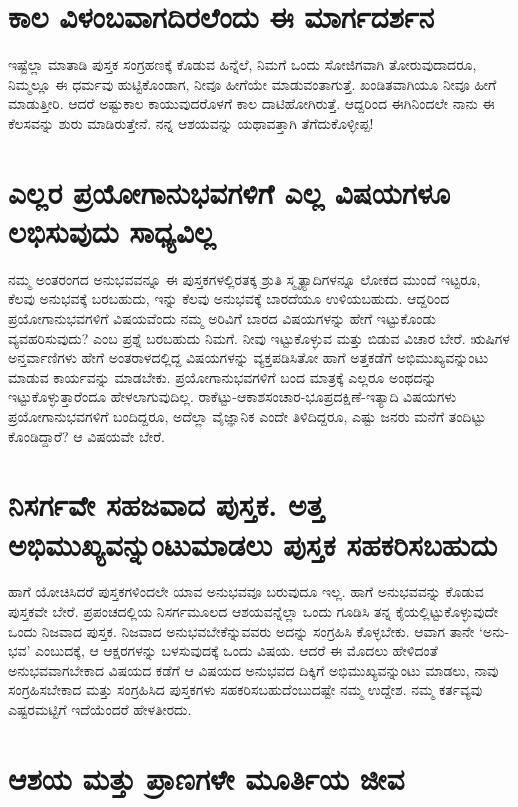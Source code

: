 \section*{ಕಾಲ ವಿಳಂಬವಾಗದಿರಲೆಂದು ಈ ಮಾರ್ಗದರ್ಶನ}

ಇಷ್ಟೆಲ್ಲಾ ಮಾತಾಡಿ ಪುಸ್ತಕ ಸಂಗ್ರಹಣಕ್ಕೆ ಕೊಡುವ ಹಿನ್ನೆಲೆ, ನಿಮಗೆ ಒಂದು ಸೋಜಿಗವಾಗಿ ತೋರುವುದಾದರೂ, ನಿಮ್ಮಲ್ಲೂ ಈ ಧರ್ಮವು ಹುಟ್ಟಿಕೊಂಡಾಗ, ನೀವೂ ಹೀಗೆಯೇ ಮಾಡುವಂತಾಗುತ್ತೆ. ಖಂಡಿತವಾಗಿಯೂ ನೀವೂ ಹೀಗೆ ಮಾಡುತ್ತೀರಿ. ಆದರೆ ಅಷ್ಟುಕಾಲ ಕಾಯುವುದರೊಳಗೆ ಕಾಲ ದಾಟಿಹೋಗಿರುತ್ತೆ. ಆದ್ದರಿಂದ ಈಗಿನಿಂದಲೇ ನಾನು ಈ ಕೆಲಸವನ್ನು ಶುರು ಮಾಡಿರುತ್ತೇನೆ. ನನ್ನ ಆಶಯವನ್ನು ಯಥಾವತ್ತಾಗಿ ತೆಗೆದುಕೊಳ್ಳೀಪ್ಪ!

\section*{ಎಲ್ಲರ ಪ್ರಯೋಗಾನುಭವಗಳಿಗೆ ಎಲ್ಲ ವಿಷಯಗಳೂ ಲಭಿಸುವುದು ಸಾಧ್ಯವಿಲ್ಲ}

ನಮ್ಮ ಅಂತರಂಗದ ಅನುಭವವನ್ನೂ ಈ ಪುಸ್ತಕಗಳಲ್ಲಿರತಕ್ಕ ಶ್ರುತಿ ಸ್ಮೃತ್ಯಾದಿಗಳನ್ನೂ ಲೋಕದ ಮುಂದೆ ಇಟ್ಟರೂ, ಕೆಲವು ಅನುಭವಕ್ಕೆ ಬರಬಹುದು, ಇನ್ನು ಕೆಲವು ಅನುಭವಕ್ಕೆ ಬಾರದೆಯೂ ಉಳಿಯಬಹುದು. ಆದ್ದರಿಂದ ಪ್ರಯೋಗಾನುಭವಗಳಿಗೆ ವಿಷಯವೆಂದು ನಮ್ಮ ಅರಿವಿಗೆ ಬಾರದ ವಿಷಯಗಳನ್ನು ಹೇಗೆ ಇಟ್ಟುಕೊಂಡು ವ್ಯವಹರಿಸುವುದು? ಎಂಬ ಪ್ರಶ್ನೆ ಬರಬಹುದು ನಿಮಗೆ. ನೀವು ಇಟ್ಟುಕೊಳ್ಳುವ ಮತ್ತು ಬಿಡುವ ವಿಚಾರ ಬೇರೆ. ಋಷಿಗಳ ಅನ್ತರ್ವಾಣಿಗಳು ಹೇಗೆ ಅಂತರಾಳದಲ್ಲಿದ್ದ ವಿಷಯಗಳನ್ನು  ವ್ಯಕ್ತಪಡಿಸಿತೋ ಹಾಗೆ ಅತ್ತಕಡೆಗೆ ಅಭಿಮುಖ್ಯವನ್ನುಂಟು ಮಾಡುವ ಕಾರ್ಯವನ್ನು ಮಾಡಬೇಕು. ಪ್ರಯೋಗಾನುಭವಗಳಿಗೆ ಬಂದ ಮಾತ್ರಕ್ಕೆ ಎಲ್ಲರೂ ಅಂಥದನ್ನು ಇಟ್ಟುಕೊಳ್ಳುತ್ತಾರೆಂದೂ ಹೇಳಲಾಗುವುದಿಲ್ಲ. ರಾಕೆಟ್ಟು-ಆಕಾಶಸಂಚಾರ-ಭೂಪ್ರದಕ್ಷಿಣೆ-ಇತ್ಯಾದಿ ವಿಷಯಗಳು ಪ್ರಯೋಗಾನುಭವಗಳಿಗೆ ಬಂದಿದ್ದರೂ, ಅದೆಲ್ಲಾ ವೈಜ್ಞಾನಿಕ ಎಂದೇ ತಿಳಿದಿದ್ದರೂ, ಎಷ್ಟು ಜನರು ಮನೆಗೆ ತಂದಿಟ್ಟು ಕೊಂಡಿದ್ದಾರೆ? ಆ ವಿಷಯವೇ ಬೇರೆ.

\section*{ನಿಸರ್ಗವೇ ಸಹಜವಾದ ಪುಸ್ತಕ. ಅತ್ತ ಅಭಿಮುಖ್ಯವನ್ನುಂಟುಮಾಡಲು ಪುಸ್ತಕ ಸಹಕರಿಸಬಹುದು}

ಹಾಗೆ ಯೋಚಿಸಿದರೆ ಪುಸ್ತಕಗಳಿಂದಲೇ ಯಾವ ಅನುಭವವೂ ಬರುವುದೂ ಇಲ್ಲ. ಹಾಗೆ ಅನುಭವವನ್ನು ಕೊಡುವ ಪುಸ್ತಕವೇ ಬೇರೆ. ಪ್ರಪಂಚದಲ್ಲಿಯ ನಿಸರ್ಗಮೂಲದ ಆಶಯವನ್ನೆಲ್ಲಾ ಒಂದು ಗೂಡಿಸಿ ತನ್ನ ಕೈಯಲ್ಲಿಟ್ಟುಕೊಳ್ಳುವುದೇ  ಒಂದು ನಿಜವಾದ ಪುಸ್ತಕ. ನಿಜವಾದ ಅನುಭವಬೇಕೆನ್ನುವವರು ಅದನ್ನು ಸಂಗ್ರಹಿಸಿ ಕೊಳ್ಳಬೇಕು. ಆವಾಗ ತಾನೇ `ಅನು-ಭವ' ಎಂಬುದಕ್ಕೆ, ಆ ಆಕ್ಷರಗಳನ್ನು ಬಳಸುವುದಕ್ಕೆ ಒಂದು ವಿಷಯ. ಆದರೆ ಈ ಮೊದಲು ಹೇಳಿದಂತೆ ಅನುಭವವಾಗಬೇಕಾದ ವಿಷಯದ ಕಡೆಗೆ ಆ ವಿಷಯದ ಅನುಭವದ ದಿಕ್ಕಿಗೆ ಅಭಿಮುಖ್ಯವನ್ನುಂಟು ಮಾಡಲು, ನಾವು ಸಂಗ್ರಹಿಸಬೇಕಾದ ಮತ್ತು ಸಂಗ್ರಹಿಸಿದ ಪುಸ್ತಕಗಳು ಸಹಕರಿಸಬಹುದೆಂಬುದಷ್ಟೇ ನಮ್ಮ ಉದ್ದೇಶ. ನಮ್ಮ ಕರ್ತವ್ಯವು ಎಷ್ಟರಮಟ್ಟಿಗೆ ಇದೆಯೆಂದರೆ ಹೇಳತೀರದು.

\section*{ಆಶಯ ಮತ್ತು ಪ್ರಾಣಗಳೇ ಮೂರ್ತಿಯ ಜೀವ}

